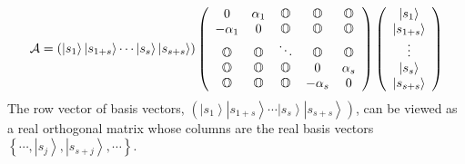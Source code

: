 \documentclass[aps,preprint]{revtex4}%
\begin{document}
\begin{equation}
\mathcal{A}=\left(  \left\vert s_{1}\right\rangle \left\vert s_{1+s}%
\right\rangle \cdots\left\vert s_{s}\right\rangle \left\vert s_{s+s}%
\right\rangle \right)  \left(
\begin{array}
[c]{ccccc}%
0 & \alpha_{1} & \mathbb{O} & \mathbb{O} & \mathbb{O}\\
-\alpha_{1} & 0 & \mathbb{O} & \mathbb{O} & \mathbb{O}\\
\mathbb{O} & \mathbb{O} & \ddots & \mathbb{O} & \mathbb{O}\\
\mathbb{O} & \mathbb{O} & \mathbb{O} & 0 & \alpha_{s}\\
\mathbb{O} & \mathbb{O} & \mathbb{O} & -\alpha_{s} & 0
\end{array}
\right)  \left(
\begin{array}
[c]{c}%
\left\vert s_{1}\right\rangle \\
\left\vert s_{1+s}\right\rangle \\
\vdots\\
\left\vert s_{s}\right\rangle \\
\left\vert s_{s+s}\right\rangle
\end{array}
\right) \label{reex}%
\end{equation}
The row vector of basis vectors, $\left(  \left\vert s_{1}\right\rangle
\left\vert s_{1+s}\right\rangle \cdots\left\vert s_{s}\right\rangle \left\vert
s_{s+s}\right\rangle \right)  $, can be viewed as a real orthogonal matrix
whose columns are the real basis vectors $\left\{  \cdots,\left\vert
s_{j}\right\rangle ,\left\vert s_{s+j}\right\rangle ,\cdots\right\}  $.
\end{document}
